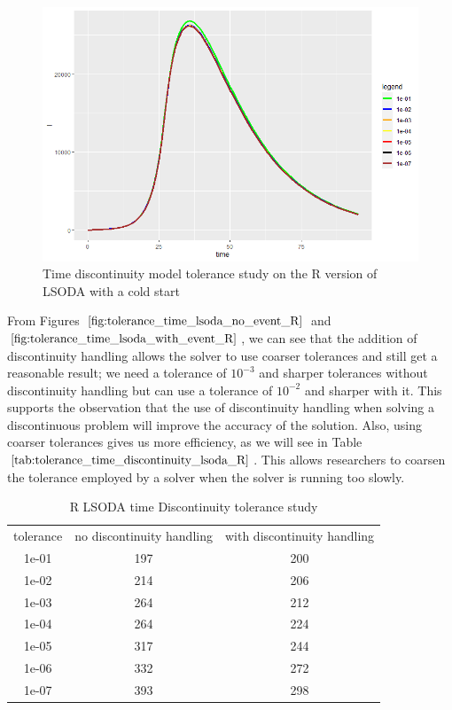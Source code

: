 \begin{figure}[h]
\centering
\includegraphics[width=0.7\linewidth]{./figures/tolerance_time_lsoda_with_event_R}
\caption{Time discontinuity model tolerance study on the R version of LSODA with a cold start}
\label{fig:tolerance_time_lsoda_with_event_R}
\end{figure}

From Figures $\ref{fig:tolerance_time_lsoda_no_event_R}$ and $\ref{fig:tolerance_time_lsoda_with_event_R}$, we can see that the addition of discontinuity handling allows the solver to use coarser tolerances and still get a reasonable result; we need a tolerance of $10^{-3}$ and sharper tolerances without discontinuity handling but can use a tolerance of $10^{-2}$ and sharper with it. This supports the observation that the use of discontinuity handling when solving a discontinuous problem will improve the accuracy of the solution. Also, using coarser tolerances gives us more efficiency, as we will see in Table $\ref{tab:tolerance_time_discontinuity_lsoda_R}$. This allows researchers to coarsen the tolerance employed by a solver when the solver is running too slowly.

\begin{table}[h]
\caption {R LSODA time Discontinuity tolerance study} \label{tab:tolerance_time_discontinuity_lsoda_R} 
\begin{center}
\begin{tabular}{ c c c }
tolerance & no discontinuity handling & with discontinuity handling \\ 
1e-01 & 197 & 200 \\
1e-02 & 214 & 206 \\
1e-03 & 264 & 212 \\
1e-04 & 264 & 224 \\
1e-05 & 317 & 244 \\
1e-06 & 332 & 272 \\
1e-07 & 393 & 298 \\
\end{tabular}
\end{center}
\end{table}

